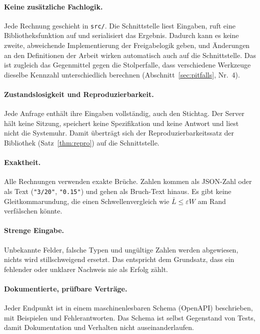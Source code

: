 \documentclass[a4paper,12pt]{article}
\theoremstyle{definition}
\begin{document}
\paragraph{Keine zusätzliche Fachlogik.}
Jede Rechnung geschieht in \texttt{src/}. Die Schnittstelle liest Eingaben, ruft eine Bibliotheksfunktion auf und serialisiert das Ergebnis. Dadurch kann es keine zweite, abweichende Implementierung der Freigabelogik geben, und Änderungen an den Definitionen der Arbeit wirken automatisch auch auf die Schnittstelle. Das ist zugleich das Gegenmittel gegen die Stolperfalle, dass verschiedene Werkzeuge dieselbe Kennzahl unterschiedlich berechnen (Abschnitt~\ref{sec:pitfalls}, Nr.~4).

\paragraph{Zustandslosigkeit und Reproduzierbarkeit.}
Jede Anfrage enthält ihre Eingaben vollständig, auch den Stichtag. Der Server hält keine Sitzung, speichert keine Spezifikation und keine Antwort und liest nicht die Systemuhr. Damit überträgt sich der Reproduzierbarkeitssatz der Bibliothek (Satz~\ref{thm:repro}) auf die Schnittstelle.

\paragraph{Exaktheit.}
Alle Rechnungen verwenden exakte Brüche. Zahlen kommen als JSON-Zahl oder als Text (\texttt{"3/20"}, \texttt{"0.15"}) und gehen als Bruch-Text hinaus. Es gibt keine Gleitkommarundung, die einen Schwellenvergleich wie $\bar L\le\varepsilon W$ am Rand verfälschen könnte.

\paragraph{Strenge Eingabe.}
Unbekannte Felder, falsche Typen und ungültige Zahlen werden abgewiesen, nichts wird stillschweigend ersetzt. Das entspricht dem Grundsatz, dass ein fehlender oder unklarer Nachweis nie als Erfolg zählt.

\paragraph{Dokumentierte, prüfbare Verträge.}
Jeder Endpunkt ist in einem maschinenlesbaren Schema (OpenAPI) beschrieben, mit Beispielen und Fehlerantworten. Das Schema ist selbst Gegenstand von Tests, damit Dokumentation und Verhalten nicht auseinanderlaufen.
\end{document}
